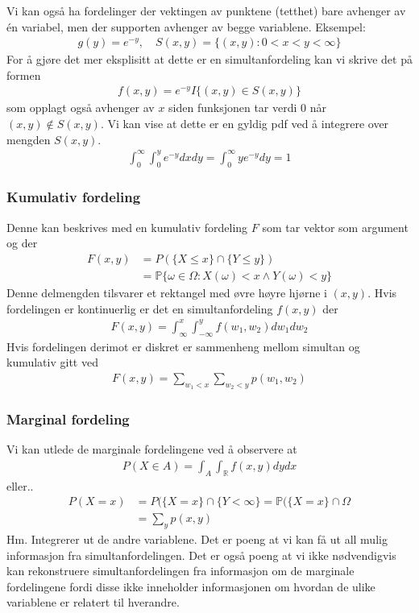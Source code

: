 Vi kan også ha fordelinger der vektingen av punktene (tetthet) bare avhenger av én variabel, men der supporten avhenger av begge variablene. Eksempel:
\begin{align}
g(y)=e^{-y}, \quad S(x,y)=\{(x,y):0<x<y<\infty\}
\end{align}
For å gjøre det mer eksplisitt at dette er en simultanfordeling kan vi skrive det på formen
\begin{align}
f(x,y)=e^{-y}I\{(x,y) \in S(x,y)\}
\end{align}
som opplagt også avhenger av $x$ siden funksjonen tar verdi $0$ når $(x,y) \notin S(x,y)$. Vi kan vise at dette er en gyldig pdf ved å integrere over mengden $S(x,y)$. 
\begin{align}
\int_0^{\infty}\int_0^ye^{-y}dxdy = \int_0^{\infty}ye^{-y}dy=1
\end{align}
\subsubsection{Kumulativ fordeling}
Denne kan beskrives med en kumulativ fordeling $F$ som tar vektor som argument og der
\begin{align}
F(x,y) &= P(\{X \leq x\} \cap \{Y \leq y\}) \\
&= \mathbb{P}\{\omega \in \Omega : X(\omega)<x \land Y(\omega)<y\}
\end{align}
Denne delmengden tilsvarer et rektangel med øvre høyre hjørne i $(x,y)$. Hvis fordelingen er kontinuerlig er det en simultanfordeling $f(x,y)$ der
\begin{align}
F(x,y) = \int_{\infty}^x \int_{-\infty}^y f(w_1,w_2)dw_1dw_2
\end{align}
Hvis fordelingen derimot er diskret er sammenheng mellom simultan og kumulativ gitt ved
\begin{align}
F(x,y) = \sum_{w_1<x} \sum_{w_2<y} p(w_1,w_2)
\end{align}
\subsubsection{Marginal fordeling}
Vi kan utlede de marginale fordelingene ved å observere at
\begin{align}
P(X \in A) = \int_A \int_{\mathbb{R}} f(x,y)dydx
\end{align}
eller..
\begin{align}
P(X=x) &= P(\{X=x\}\cap \{Y < \infty\} = \mathbb{P}(\{X=x\}\cap \Omega \\
&= \sum_y p(x,y)
\end{align}
Hm. Integrerer ut de andre variablene. Det er poeng at vi kan få ut all mulig informasjon fra simultanfordelingen. Det er også poeng at vi ikke nødvendigvis kan rekonstruere simultanfordelingen fra informasjon om de marginale fordelingene fordi disse ikke inneholder informasjonen om hvordan de ulike variablene er relatert til hverandre. 
